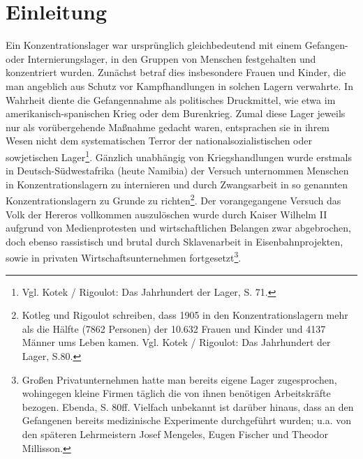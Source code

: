 \documentclass[a4paper,12pt,ngerman,
]{nisebook}
\begin{document}
\section*{Einleitung}
Ein Konzentrationslager war ursprünglich gleichbedeutend mit einem Gefangen- oder Internierungslager, in den Gruppen von Menschen festgehalten und konzentriert wurden. 
Zunächst betraf dies insbesondere Frauen und Kinder, die man angeblich aus Schutz vor Kampfhandlungen in solchen Lagern verwahrte. In Wahrheit diente die Gefangennahme als politisches Druckmittel, wie etwa im amerikanisch-spanischen Krieg oder dem Burenkrieg. Zumal diese Lager jeweils nur als vorübergehende Maßnahme gedacht waren, entsprachen sie in ihrem Wesen nicht dem systematischen Terror der nationalsozialistischen oder sowjetischen Lager\footnote{Vgl. Kotek / Rigoulot: Das Jahrhundert der Lager, S. 71.}. Gänzlich unabhängig von Kriegshandlungen wurde erstmals in Deutsch-Südwestafrika (heute Namibia) der Versuch unternommen Menschen in Konzentrationslagern zu internieren und durch Zwangsarbeit in so genannten Konzentrationslagern zu Grunde zu richten\footnote{Kotleg und Rigoulot schreiben, dass 1905 in den Konzentrationslagern mehr als die Hälfte (7862 Personen) der 10.632 Frauen und Kinder und 4137 Männer ums Leben kamen. Vgl. Kotek / Rigoulot: Das Jahrhundert der Lager, S.80.}. Der vorangegangene Versuch das Volk der Hereros vollkommen auszulöschen wurde durch Kaiser Wilhelm II aufgrund von Medienprotesten und wirtschaftlichen Belangen zwar abgebrochen, doch ebenso rassistisch und brutal durch Sklavenarbeit in Eisenbahnprojekten, sowie in privaten Wirtschaftsunternehmen fortgesetzt\footnote{Großen Privatunternehmen hatte man bereits eigene Lager zugesprochen, wohingegen kleine Firmen täglich die von ihnen benötigen Arbeitskräfte bezogen. Ebenda, S. 80ff. Vielfach unbekannt ist darüber hinaus, dass an den Gefangenen bereits medizinische Experimente durchgeführt wurden; u.a. von den späteren Lehrmeistern Josef Mengeles, Eugen Fischer und Theodor Millisson.}.
\end{document}
